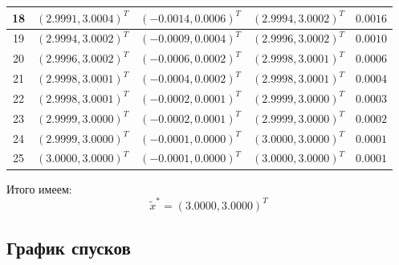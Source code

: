\documentclass[12pt]{article}
\begin{document}
\begin{table}[H]
\begin{tabular}{|c|c|c|c|c|}
\hline
18 & $(2.9991, 3.0004)^T$ & $(-0.0014, 0.0006)^T$ & $(2.9994, 3.0002)^T$ & $0.0016$ \\
\hline
19 & $(2.9994, 3.0002)^T$ & $(-0.0009, 0.0004)^T$ & $(2.9996, 3.0002)^T$ & $0.0010$ \\
\hline
20 & $(2.9996, 3.0002)^T$ & $(-0.0006, 0.0002)^T$ & $(2.9998, 3.0001)^T$ & $0.0006$ \\
\hline
21 & $(2.9998, 3.0001)^T$ & $(-0.0004, 0.0002)^T$ & $(2.9998, 3.0001)^T$ & $0.0004$ \\
\hline
22 & $(2.9998, 3.0001)^T$ & $(-0.0002, 0.0001)^T$ & $(2.9999, 3.0000)^T$ & $0.0003$ \\
\hline
23 & $(2.9999, 3.0000)^T$ & $(-0.0002, 0.0001)^T$ & $(2.9999, 3.0000)^T$ & $0.0002$ \\
\hline
24 & $(2.9999, 3.0000)^T$ & $(-0.0001, 0.0000)^T$ & $(3.0000, 3.0000)^T$ & $0.0001$ \\
\hline
25 & $(3.0000, 3.0000)^T$ & $(-0.0001, 0.0000)^T$ & $(3.0000, 3.0000)^T$ & $0.0001$ \\
\hline

\end{tabular}
\end{table}

Итого имеем:
\[
  \tilde{x}^{\ast}=(3.0000, 3.0000)^T
\]

\subsection{График спусков}
\end{document}
